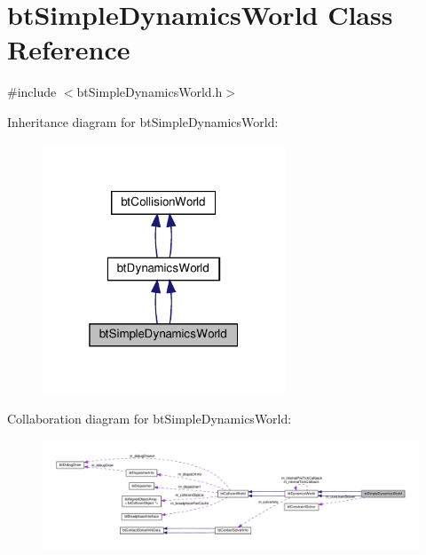 \hypertarget{classbtSimpleDynamicsWorld}{}\section{bt\+Simple\+Dynamics\+World Class Reference}
\label{classbtSimpleDynamicsWorld}


{\ttfamily \#include $<$bt\+Simple\+Dynamics\+World.\+h$>$}



Inheritance diagram for bt\+Simple\+Dynamics\+World\+:
\nopagebreak
\begin{figure}[H]
\begin{center}
\leavevmode
\includegraphics[width=205pt]{classbtSimpleDynamicsWorld__inherit__graph}
\end{center}
\end{figure}


Collaboration diagram for bt\+Simple\+Dynamics\+World\+:
\nopagebreak
\begin{figure}[H]
\begin{center}
\leavevmode
\includegraphics[width=350pt]{classbtSimpleDynamicsWorld__coll__graph}
\end{center}
\end{figure}
